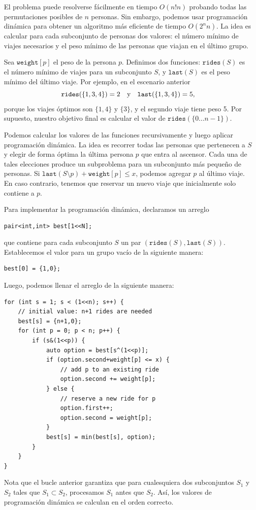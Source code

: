 El problema puede resolverse fácilmente en tiempo $O(n! n)$
probando todas las permutaciones posibles de $n$ personas.
Sin embargo, podemos usar programación dinámica para obtener
un algoritmo más eficiente de tiempo $O(2^n n)$.
La idea es calcular para cada subconjunto de personas
dos valores: el número mínimo de viajes necesarios y
el peso mínimo de las personas que viajan en el último grupo.

Sea $\texttt{weight}[p]$ el peso de
la persona $p$.
Definimos dos funciones:
$\texttt{rides}(S)$ es el número mínimo de
viajes para un subconjunto $S$,
y $\texttt{last}(S)$ es el peso mínimo
del último viaje.
Por ejemplo, en el escenario anterior
\[ \texttt{rides}(\{1,3,4\})=2 \hspace{10px} \textrm{y}
\hspace{10px} \texttt{last}(\{1,3,4\})=5,\]
porque los viajes óptimos son $\{1,4\}$ y $\{3\}$,
y el segundo viaje tiene peso 5.
Por supuesto, nuestro objetivo final es calcular el valor
de $\texttt{rides}(\{0 \ldots n-1\})$.

Podemos calcular los valores
de las funciones recursivamente y luego aplicar
programación dinámica.
La idea es recorrer todas las personas
que pertenecen a $S$ y elegir de forma óptima
la última persona $p$ que entra al ascensor.
Cada una de tales elecciones produce un subproblema
para un subconjunto más pequeño de personas.
Si $\texttt{last}(S \setminus p)+\texttt{weight}[p] \le x$,
podemos agregar $p$ al último viaje.
En caso contrario, tenemos que reservar un nuevo viaje
que inicialmente solo contiene a $p$.

Para implementar la programación dinámica,
declaramos un arreglo
\begin{lstlisting}
pair<int,int> best[1<<N];
\end{lstlisting}
que contiene para cada subconjunto $S$
un par $(\texttt{rides}(S),\texttt{last}(S))$.
Establecemos el valor para un grupo vacío de la siguiente manera:
\begin{lstlisting}
best[0] = {1,0};
\end{lstlisting}
Luego, podemos llenar el arreglo de la siguiente manera:

\begin{lstlisting}
for (int s = 1; s < (1<<n); s++) {
    // initial value: n+1 rides are needed
    best[s] = {n+1,0};
    for (int p = 0; p < n; p++) {
        if (s&(1<<p)) {
            auto option = best[s^(1<<p)];
            if (option.second+weight[p] <= x) {
                // add p to an existing ride
                option.second += weight[p];
            } else {
                // reserve a new ride for p
                option.first++;
                option.second = weight[p];
            }
            best[s] = min(best[s], option);
        }
    }
}
\end{lstlisting}
Nota que el bucle anterior garantiza que
para cualesquiera dos subconjuntos $S_1$ y $S_2$
tales que $S_1 \subset S_2$, procesamos $S_1$ antes que $S_2$.
Así, los valores de programación dinámica se calculan en el
orden correcto.

